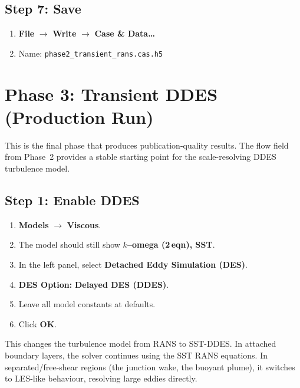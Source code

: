 \documentclass[12pt,a4paper]{report}
\begin{document}
\section{Step 7: Save}

\begin{enumerate}
  \item \textbf{File} $\rightarrow$ \textbf{Write} $\rightarrow$
        \textbf{Case \& Data\ldots}
  \item Name: \texttt{phase2\_transient\_rans.cas.h5}
\end{enumerate}


\chapter{Phase 3: Transient DDES (Production Run)}
\label{ch:phase3}

This is the final phase that produces publication-quality results.
The flow field from Phase~2 provides a stable starting point for the
scale-resolving DDES turbulence model.


\section{Step 1: Enable DDES}

\begin{enumerate}
  \item \textbf{Models} $\rightarrow$ \textbf{Viscous}.
  \item The model should still show \textbf{$k$--omega (2\,eqn), SST}.
  \item In the left panel, select \textbf{Detached Eddy Simulation
        (DES)}.
  \item \textbf{DES Option:} \textbf{Delayed DES (DDES)}.
  \item Leave all model constants at defaults.
  \item Click \textbf{OK}.
\end{enumerate}

\noindent This changes the turbulence model from RANS to SST-DDES.
In attached boundary layers, the solver continues using the SST RANS
equations.  In separated/free-shear regions (the junction wake, the
buoyant plume), it switches to LES-like behaviour, resolving large
eddies directly.

\noindent{}
\end{document}
